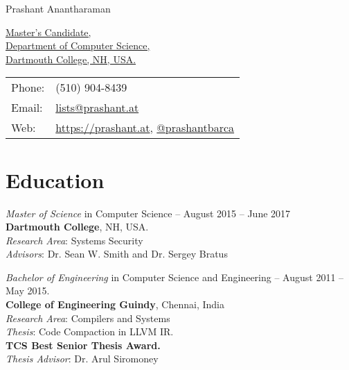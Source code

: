 \documentclass[letterpaper,10pt]{article}
\def\name{Prashant Anantharaman}
\renewenvironment{itemize}{
  \begin{list}{}{
    \setlength{\leftmargin}{1.5em}
  }
}{
  \end{list}
}
\begin{document}
{\huge \name}


\vspace{0.25in}

\begin{minipage}{0.55\linewidth}
    \href{}{Master's Candidate,}\\
  \href{}{Department of Computer Science,}\\
  \href{}{Dartmouth College, NH, USA.}\\
\end{minipage}
\begin{minipage}{0.35\linewidth}
  \begin{tabular}{ll}
    Phone: & (510) 904-8439 \\
    Email: & \href{mailto:lists@prashant}{lists@prashant.at} \\
    Web: & \href{https://prashant.at}{https://prashant.at}, \href{http://www.twitter.com/prashantbarca/}{@prashantbarca} \\
  \end{tabular}
\end{minipage}

\section*{Education}
\begin{itemize}
\setlength\itemsep{0.5ex}
\item \textit{Master of Science} in Computer Science -- August 2015 -- June 2017\\\textbf{Dartmouth College}, NH, USA.\\
    \textit{Research Area}: Systems Security\\
    \textit{Advisors}: Dr. Sean W. Smith and Dr. Sergey Bratus
\item \textit{Bachelor of Engineering} in Computer Science and Engineering -- August 2011 -- May 2015.\\ \textbf{College of Engineering Guindy}, Chennai, India\\
    \textit{Research Area}: Compilers and Systems\\
    \textit{Thesis}: Code Compaction in LLVM IR.\\
    \textbf{TCS Best Senior Thesis Award.}\\
    \textit{Thesis Advisor}: Dr. Arul Siromoney
\end{itemize}
\end{document}
